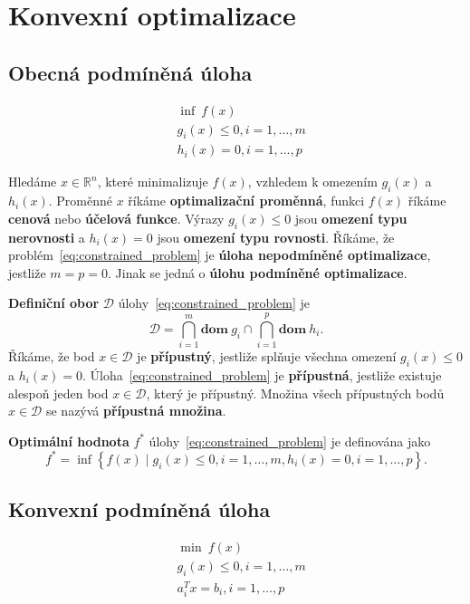 \chapter{Konvexní optimalizace}

\section{Obecná podmíněná úloha}

\begin{equation}\label{eq:constrained_problem}
    \begin{split}
        &\inf\ f(x) \\
        &g_i(x) \leq 0, i = 1, \dots, m \\
        &h_i(x) = 0, i = 1, \dots, p
    \end{split}
\end{equation}

Hledáme $x \in \mathbb{R}^n$, které minimalizuje $f(x)$, vzhledem k omezením $g_i(x)$ a $h_i(x)$. Proměnné $x$ říkáme \textbf{optimalizační proměnná}, funkci $f(x)$ říkáme \textbf{cenová} nebo \textbf{účelová funkce}. Výrazy $g_i(x) \leq 0$ jsou \textbf{omezení typu nerovnosti} a $h_i(x) = 0$ jsou \textbf{omezení typu rovnosti}. Říkáme, že problém~\ref{eq:constrained_problem} je \textbf{úloha nepodmíněné optimalizace}, jestliže $m = p = 0$. Jinak se jedná o \textbf{úlohu podmíněné optimalizace}.

\textbf{Definiční obor} $\mathcal{D}$ úlohy~\ref{eq:constrained_problem} je
$$
    \mathcal{D} = \bigcap_{i=1}^m \textbf{dom}\ g_i \cap \bigcap_{i=1}^p \textbf{dom}\ h_i.
$$
Říkáme, že bod $x \in \mathcal{D}$ je \textbf{přípustný}, jestliže splňuje všechna omezení $g_i(x) \leq 0$ a $h_i(x) = 0$. Úloha~\ref{eq:constrained_problem} je \textbf{přípustná}, jestliže existuje alespoň jeden bod $x \in \mathcal{D}$, který je přípustný. Množina všech přípustných bodů $x \in \mathcal{D}$ se nazývá \textbf{přípustná množina}.

\textbf{Optimální hodnota} $f^*$ úlohy~\ref{eq:constrained_problem} je definována jako
$$
    f^* = \inf \left\{ f(x) \mid g_i(x) \leq 0, i = 1, \dots, m, h_i(x) = 0, i = 1, \dots, p \right\}.
$$

\section{Konvexní podmíněná úloha}

\begin{equation}\label{eq:convex_problem}
    \begin{split}
        &\min\ f(x) \\
        &g_i(x) \leq 0, i = 1, \dots, m \\
        &a_i^Tx = b_i, i = 1, \dots, p
    \end{split}
\end{equation}

